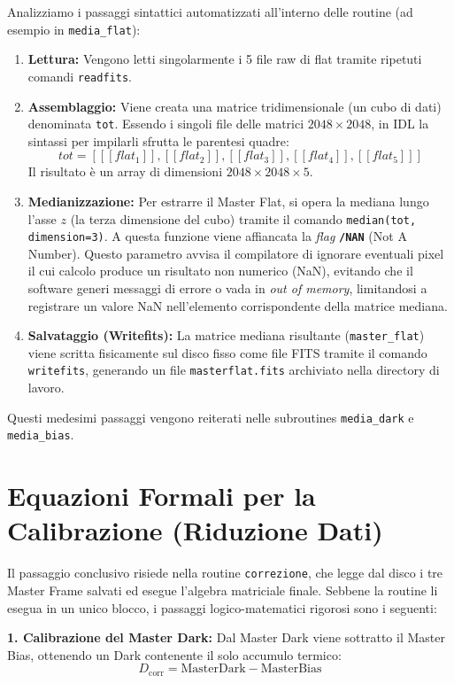 Analizziamo i passaggi sintattici automatizzati all'interno delle routine (ad esempio in \texttt{media\_flat}):
\begin{enumerate}
\item \textbf{Lettura:} Vengono letti singolarmente i 5 file raw di flat tramite ripetuti comandi \texttt{readfits}.
\item \textbf{Assemblaggio:} Viene creata una matrice tridimensionale (un cubo di dati) denominata \texttt{tot}. Essendo i singoli file delle matrici $2048 \times 2048$, in IDL la sintassi per impilarli sfrutta le parentesi quadre:
\begin{equation}
tot = [ [[flat_1]], [[flat_2]], [[flat_3]], [[flat_4]], [[flat_5]] ]
\end{equation}
Il risultato è un array di dimensioni $2048 \times 2048 \times 5$.
\item \textbf{Medianizzazione:} Per estrarre il Master Flat, si opera la mediana lungo l'asse $z$ (la terza dimensione del cubo) tramite il comando \texttt{median(tot, dimension=3)}.
A questa funzione viene affiancata la \textit{flag} \textbf{\texttt{/NAN}} (Not A Number). Questo parametro avvisa il compilatore di ignorare eventuali pixel il cui calcolo produce un risultato non numerico (NaN), evitando che il software generi messaggi di errore o vada in \textit{out of memory}, limitandosi a registrare un valore NaN nell'elemento corrispondente della matrice mediana.
\item \textbf{Salvataggio (Writefits):} La matrice mediana risultante (\texttt{master\_flat}) viene scritta fisicamente sul disco fisso come file FITS tramite il comando \texttt{writefits}, generando un file \texttt{masterflat.fits} archiviato nella directory di lavoro.
\end{enumerate}
Questi medesimi passaggi vengono reiterati nelle subroutines \texttt{media\_dark} e \texttt{media\_bias}.

\section{Equazioni Formali per la Calibrazione (Riduzione Dati)}

Il passaggio conclusivo risiede nella routine \texttt{correzione}, che legge dal disco i tre Master Frame salvati ed esegue l'algebra matriciale finale. Sebbene la routine li esegua in un unico blocco, i passaggi logico-matematici rigorosi sono i seguenti:

\textbf{1. Calibrazione del Master Dark:}
Dal Master Dark viene sottratto il Master Bias, ottenendo un Dark contenente il solo accumulo termico:
\begin{equation}
D_{\text{corr}} = \text{MasterDark} - \text{MasterBias}
\end{equation}


